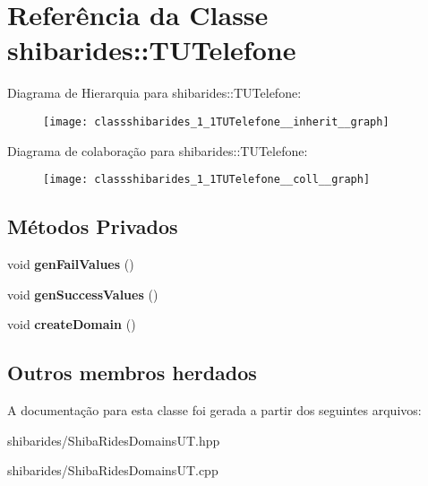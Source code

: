 \hypertarget{classshibarides_1_1TUTelefone}{}\section{Referência da Classe shibarides\+:\+:T\+U\+Telefone}
\label{classshibarides_1_1TUTelefone}


Diagrama de Hierarquia para shibarides\+:\+:T\+U\+Telefone\+:\nopagebreak
\begin{figure}[H]
\begin{center}
\leavevmode
\texttt{[image: classshibarides\_1\_1TUTelefone\_\_inherit\_\_graph]}
\end{center}
\end{figure}


Diagrama de colaboração para shibarides\+:\+:T\+U\+Telefone\+:\nopagebreak
\begin{figure}[H]
\begin{center}
\leavevmode
\texttt{[image: classshibarides\_1\_1TUTelefone\_\_coll\_\_graph]}
\end{center}
\end{figure}
\subsection*{Métodos Privados}
\begin{DoxyCompactItemize}
\item 
void {\bfseries gen\+Fail\+Values} ()\hypertarget{classshibarides_1_1TUTelefone_ad5b7d969825572158769a8deeea35865}{}\label{classshibarides_1_1TUTelefone_ad5b7d969825572158769a8deeea35865}

\item 
void {\bfseries gen\+Success\+Values} ()\hypertarget{classshibarides_1_1TUTelefone_a4f099eb87da42f7f28b5ea4dd0d1edae}{}\label{classshibarides_1_1TUTelefone_a4f099eb87da42f7f28b5ea4dd0d1edae}

\item 
void {\bfseries create\+Domain} ()\hypertarget{classshibarides_1_1TUTelefone_a5d3f5bfcd7f13a7f381a41cc64e0a527}{}\label{classshibarides_1_1TUTelefone_a5d3f5bfcd7f13a7f381a41cc64e0a527}

\end{DoxyCompactItemize}
\subsection*{Outros membros herdados}


A documentação para esta classe foi gerada a partir dos seguintes arquivos\+:\begin{DoxyCompactItemize}
\item 
shibarides/Shiba\+Rides\+Domains\+U\+T.\+hpp\item 
shibarides/Shiba\+Rides\+Domains\+U\+T.\+cpp\end{DoxyCompactItemize}
